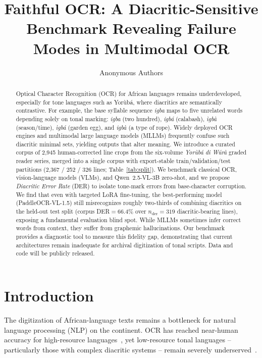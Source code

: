 \documentclass{article}
\title{Faithful \Yoruba{} OCR: A Diacritic-Sensitive Benchmark Revealing Failure Modes in Multimodal OCR}
\author{
Anonymous Authors
}
\newcommand{\Yoruba}{Yor\`ub\'a}
\begin{document}
\maketitle

\begin{abstract}
Optical Character Recognition (OCR) for African languages remains underdeveloped, especially for tone languages such as \Yoruba{}, where diacritics are semantically contrastive. For example, the base syllable sequence \emph{igba} maps to five unrelated words depending solely on tonal marking: \emph{igba} (two hundred), \emph{igb\'a} (calabash), \emph{\`igb\`a} (season/time), \emph{\`igb\'a} (garden egg), and \emph{igb\`a} (a type of rope). Widely deployed OCR engines and multimodal large language models (MLLMs) frequently confuse such diacritic minimal sets, yielding outputs that alter meaning.
We introduce a curated corpus of 2{,}945 human-corrected line crops from the six-volume \emph{\Yoruba{} di W\'ur\`a} graded reader series, merged into a single corpus with export-stable train/validation/test partitions (2{,}367 / 252 / 326 lines; Table~\ref{tab:split}). We benchmark classical OCR, vision-language models (VLMs), and Qwen~2.5-VL-3B zero-shot, and we propose \emph{Diacritic Error Rate} (DER) to isolate tone-mark errors from base-character corruption.
We find that even with targeted LoRA fine-tuning, the best-performing model (PaddleOCR-VL-1.5) still misrecognizes roughly two-thirds of combining diacritics on the held-out test split (corpus DER${=}66.4\%$ over $n_{\mathrm{der}}{=}319$ diacritic-bearing lines), exposing a fundamental evaluation blind spot. While MLLMs sometimes infer correct words from context, they suffer from graphemic hallucinations. Our benchmark provides a diagnostic tool to measure this fidelity gap, demonstrating that current architectures remain inadequate for archival digitization of tonal scripts. Data and code will be publicly released.
\end{abstract}

\section{Introduction}

The digitization of African-language texts remains a bottleneck for natural language processing (NLP) on the continent. OCR has reached near-human accuracy for high-resource languages~\cite{du2020ppocr}, yet low-resource tonal languages -- particularly those with complex diacritic systems -- remain severely underserved~\cite{agarwal2024ocr}.
\end{document}
